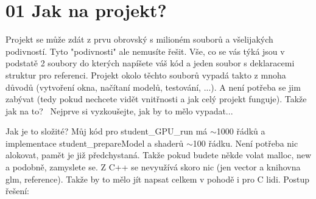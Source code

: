 \chapter{01 Jak na projekt?}
\hypertarget{p01_jakNaTo}{}\label{p01_jakNaTo}
Projekt se může zdát z prvu obrovský s milioném souborů a všelijakých podivností. Tyto "{}podivnosti"{} ale nemusíte řešit. Vše, co se vás týká jsou v podstatě 2 soubory do kterých napíšete váš kód a jeden soubor s deklaracemi struktur pro referenci. Projekt okolo těchto souborů vypadá takto z mnoha důvodů (vytvoření okna, načítaní modelů, testování, ...). A není potřeba se jim zabývat (tedy pokud nechcete vidět vnitřnosti a jak celý projekt funguje). Takže jak na to?~\newline
 Nejprve si vyzkoušejte, jak by to mělo vypadat... 
\begin{DoxyCode}{0}
\DoxyCodeLine{}

\end{DoxyCode}
 Jak je to složité? Můj kód pro student\+\_\+\+GPU\+\_\+run má \texorpdfstring{$\sim$}{\string~}1000 řádků a implementace student\+\_\+prepare\+Model a shaderů \texorpdfstring{$\sim$}{\string~}100 řádku. Není potřeba nic alokovat, pamět je již předchystaná. Takže pokud budete někde volat malloc, new a podobně, zamyslete se. Z C++ se nevyužívá skoro nic (jen vector a knihovna glm, reference). Takže by to mělo jít napsat celkem v pohodě i pro C lidi. Postup řešení\+:


